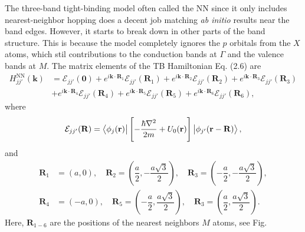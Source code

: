 \documentclass{report}
\newcommand{\f}[2]{\dfrac{#1}{#2}}
\begin{document}
The three-band tight-binding model often called the \ac{NN} since it only includes nearest-neighbor hopping does a decent job matching \textit{ab initio} results near the band edges. However, it starts to break down in other parts of the band structure. This is because the model completely ignores the $p$ orbitals from the $X$ atoms, which stil contributions to the conduction bands at $\Gamma$ and the valence bands at $M$. The matrix elements of the \ac{TB} Hamiltonian Eq. (2.6) are
\begin{equation}
	\begin{aligned}
		H_{jj'}^{\text{NN}}(\mathbf{k})
		 & = \mathcal{E}_{jj'}(\mathbf{0}) + e^{i\mathbf{k}\cdot \mathbf{R}_{1}}\mathcal{E}_{jj'}(\mathbf{R}_{1}) + e^{i\mathbf{k}\cdot \mathbf{R}_{2}}\mathcal{E}_{jj'}(\mathbf{R}_{2}) + e^{i\mathbf{k}\cdot \mathbf{R}_{3}}\mathcal{E}_{jj'}(\mathbf{R}_{3}) \\
		 & + e^{i\mathbf{k}\cdot \mathbf{R}_{4}}\mathcal{E}_{jj'}(\mathbf{R}_{4}) + e^{i\mathbf{k}\cdot \mathbf{R}_{5}}\mathcal{E}_{jj'}(\mathbf{R}_{5}) + e^{i\mathbf{k}\cdot \mathbf{R}_{6}}\mathcal{E}_{jj'}(\mathbf{R}_{6}),
	\end{aligned}
\end{equation}
where
\begin{gather}
	\mathcal{E}_{jj'}(\mathbf{R}) = \bra{\phi_{j}(\mathbf{r})} \left[-\frac{\hbar \nabla^{2}}{2m} + U_{0} (\mathbf{r})\right] \ket{\phi_{j'}(\mathbf{r-R})},
\end{gather}
and
\begin{equation}
	\begin{aligned}
		\mathbf{R}_{1} & = (a,0), \quad \mathbf{R}_{2} = \left(\f{a}{2}, - \f{a\sqrt{3}}{2}\right), \quad \mathbf{R}_{3} = \left(-\f{a}{2},-\f{a\sqrt{3}}{2}\right), \\
		\mathbf{R}_{4} & = (-a,0), \quad \mathbf{R}_{5} = \left(-\f{a}{2}, \f{a\sqrt{3}}{2}\right), \quad \mathbf{R}_{3} = \left(\f{a}{2},\f{a\sqrt{3}}{2}\right).
	\end{aligned}
\end{equation}
Here, $\mathbf{R}_{1-6}$ are the positions of the nearest neighbors $M$ atoms, see Fig.
\end{document}
